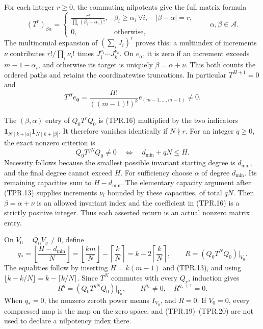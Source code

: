 For each integer \(r\geq0\), the commuting nilpotents give
the full matrix formula
\[
 (T^r)_{\beta\alpha}
 =
 \begin{cases}
 \displaystyle\frac{r!}{\prod_i(\beta_i-\alpha_i)!},
    &\beta_i\geq\alpha_i\ \forall i,\quad
                    |\beta-\alpha|=r,\\[4pt]
 0,&\text{otherwise},
 \end{cases}
 \qquad \alpha,\beta\in\mathcal A.
 \tag{TPR.16}
\]
The multinomial expansion of \((\sum_iJ_i)^r\) proves this:
a multiindex of increments \(\nu\) contributes
\(r!/\prod_i\nu_i!\) times \(J_1^{\nu_1}\cdots J_k^{\nu_k}\).
On \(e_\alpha\), it is zero if an increment exceeds
\(m-1-\alpha_i\), and otherwise its target is uniquely
\(\beta=\alpha+\nu\).
This both counts the ordered paths and retains the coordinatewise
truncations. In particular \(T^{H+1}=0\) and
\[
 T^H e_{\boldsymbol 0}
       =\frac{H!}{((m-1)!)^k}e_{(m-1,\ldots,m-1)}\ne0.
 \tag{TPR.17}
\]

The \((\beta,\alpha)\) entry of \(Q_0T^rQ_0\) is (TPR.16)
multiplied by the two indicators
\(\mathbf1_{N\mid k+|\alpha|}\mathbf1_{N\mid k+|\beta|}\).
It therefore vanishes identically if \(N\nmid r\). For an
integer \(q\geq0\), the exact nonzero criterion is
\[
 Q_0T^{qN}Q_0\ne0
       \quad\Longleftrightarrow\quad d_{\min}+qN\leq H .
 \tag{TPR.18}
\]
Necessity follows because the smallest possible invariant starting
degree is \(d_{\min}\), and the final degree cannot exceed \(H\).
For sufficiency choose \(\alpha\) of degree \(d_{\min}\).
Its remaining capacities sum to \(H-d_{\min}\). The elementary
capacity argument after (TPR.13) supplies increments \(\nu_i\)
bounded by these capacities, of total \(qN\).
Then \(\beta=\alpha+\nu\) is an allowed invariant index and
the coefficient in (TPR.16) is a strictly positive integer.
Thus each asserted return is an actual nonzero matrix entry.

On \(V_0=Q_0V_y\ne0\), define
\[
 q_*=\left\lfloor\frac{H-d_{\min}}N\right\rfloor
       =\left\lfloor\frac{km}N\right\rfloor
          -\left\lceil\frac{k}N\right\rceil
       =k-2\left\lceil\frac{k}N\right\rceil,\qquad
 R=(Q_0T^NQ_0)|_{V_0}.
 \tag{TPR.19}
\]
The equalities follow by inserting \(H=k(m-1)\) and
(TPR.13), and using
\(\lfloor k-k/N\rfloor=k-\lceil k/N\rceil\).
Since \(T^N\) commutes with every \(Q_r\), induction gives
\[
 R^q=(Q_0T^{qN}Q_0)|_{V_0},\qquad
 R^{q_*}\ne0,\quad R^{q_*+1}=0 .
 \tag{TPR.20}
\]
When \(q_*=0\), the nonzero zeroth power means \(I_{V_0}\),
and \(R=0\). If \(V_0=0\), every compressed map is the map
on the zero space, and (TPR.19)--(TPR.20) are not used to
declare a nilpotency index there.

